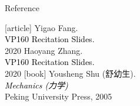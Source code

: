 \documentclass{beamer}
\begin{document}
\begin{frame}{Reference}
  \begin{thebibliography}{9}
  [article]
   Yigao Fang.\\
  \textcolor{black}{VP160 Recitation Slides.}\\
  2020
   Haoyang Zhang.\\
  \textcolor{black}{VP160 Recitation Slides.}\\
  2020
  [book]
   Yousheng Shu (舒幼生).\\
  \textcolor{black}{\textit{Mechanics (力学)}}\\
  Peking University Press, 2005
  \end{thebibliography}
  \end{frame}
  
\end{document}
